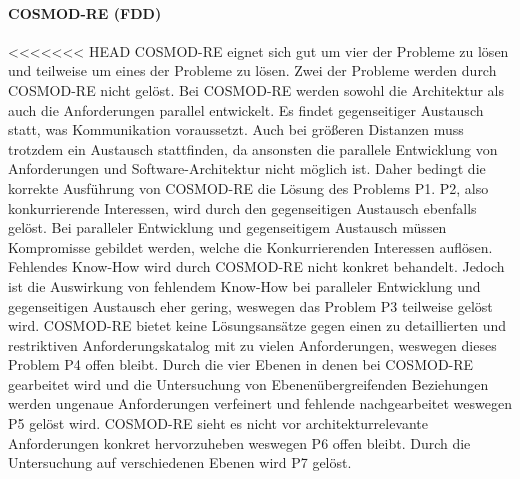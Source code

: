 \paragraph{COSMOD-RE (FDD)}
<<<<<<< HEAD
COSMOD-RE eignet sich gut um vier der Probleme zu lösen und teilweise um eines der Probleme zu lösen. Zwei der Probleme werden durch COSMOD-RE nicht gelöst. Bei COSMOD-RE werden sowohl die Architektur als auch die Anforderungen parallel entwickelt. Es findet gegenseitiger Austausch statt, was Kommunikation voraussetzt. Auch bei größeren Distanzen muss trotzdem ein Austausch stattfinden, da ansonsten die parallele Entwicklung von Anforderungen und Software-Architektur nicht möglich ist. Daher bedingt die korrekte Ausführung von COSMOD-RE die Lösung des Problems P1. P2, also konkurrierende Interessen, wird durch den gegenseitigen Austausch ebenfalls gelöst. Bei paralleler Entwicklung und gegenseitigem Austausch müssen Kompromisse gebildet werden, welche die Konkurrierenden Interessen auflösen. Fehlendes Know-How wird durch COSMOD-RE nicht konkret behandelt. Jedoch ist die Auswirkung von fehlendem Know-How bei paralleler Entwicklung und gegenseitigen Austausch eher gering, weswegen das Problem P3 teilweise gelöst wird. COSMOD-RE bietet keine Lösungsansätze gegen einen zu detaillierten und restriktiven Anforderungskatalog mit zu vielen Anforderungen, weswegen dieses Problem P4 offen bleibt. Durch die vier Ebenen in denen bei COSMOD-RE gearbeitet wird und die Untersuchung von Ebenenübergreifenden Beziehungen werden ungenaue Anforderungen verfeinert und fehlende nachgearbeitet weswegen P5 gelöst wird. COSMOD-RE sieht es nicht vor architekturrelevante Anforderungen konkret hervorzuheben weswegen P6 offen bleibt. Durch die Untersuchung auf verschiedenen Ebenen wird P7 gelöst.\\


